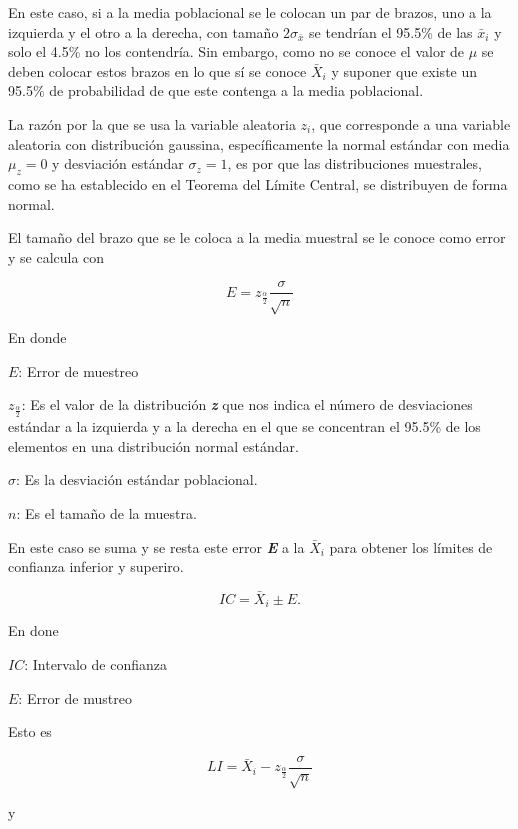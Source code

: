 \documentclass[
  oneside]{book}
\begin{document}
En este caso, si a la media poblacional se le colocan un par de brazos, uno a la izquierda y el otro a la derecha, con tamaño \(2\sigma_{\bar{x}}\) se tendrían el 95.5\% de las \(\bar{x}_i\) y solo el 4.5\% no los contendría. Sin embargo, como no se conoce el valor de \(\mu\) se deben colocar estos brazos en lo que sí se conoce \(\bar{X}_i\) y suponer que existe un 95.5\% de probabilidad de que este contenga a la media poblacional.

La razón por la que se usa la variable aleatoria \(z_i\), que corresponde a una variable aleatoria con distribución gaussina, específicamente la normal estándar con media \(\mu_z=0\) y desviación estándar \(\sigma_z=1\), es por que las distribuciones muestrales, como se ha establecido en el Teorema del Límite Central, se distribuyen de forma normal.

El tamaño del brazo que se le coloca a la media muestral se le conoce como error y se calcula con

\begin{equation}
E=z_{\frac{\alpha}{2}}\frac{\sigma}{\sqrt{n}}
\end{equation}

En donde

\(E\): Error de muestreo

\(z_{\frac{\alpha}{2}}\): Es el valor de la distribución \textbf{\emph{z}} que nos indica el número de desviaciones estándar a la izquierda y a la derecha en el que se concentran el 95.5\% de los elementos en una distribución normal estándar.

\(\sigma\): Es la desviación estándar poblacional.

\(n\): Es el tamaño de la muestra.

En este caso se suma y se resta este error \textbf{\emph{E}} a la \(\bar{X}_i\) para obtener los límites de confianza inferior y superiro.

\begin{equation}
IC=\bar{X}_i\pm E.
\end{equation}

En done

\(IC\): Intervalo de confianza

\(E\): Error de mustreo

Esto es

\begin{equation}
LI=\bar{X}_i-z_{\frac{\alpha}{2}}\frac{\sigma}{\sqrt{n}}
\end{equation}

y
\end{document}

